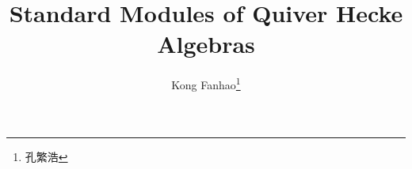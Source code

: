 \documentclass[twoside]{article}
\begin{document}
\title{Standard Modules of Quiver Hecke Algebras}
\author{Kong Fanhao\footnote{孔繁浩}}



\tableofcontents



\printbibliography       %
\end{document}
